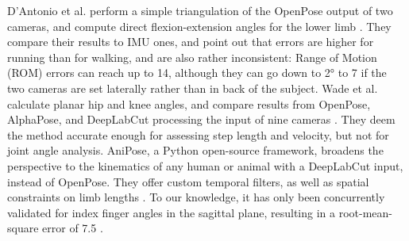D’Antonio et al. perform a simple triangulation of the OpenPose output of two cameras, and compute direct flexion-extension angles for the lower limb \cite{D'Antonio2021}. They compare their results to IMU ones, and point out that errors are higher for running than for walking, and are also rather inconsistent: Range of Motion (ROM) errors can reach up to 14\degree{}, although they can go down to 2° to 7\degree{} if the two cameras are set laterally rather than in back of the subject. Wade et al. calculate planar hip and knee angles, and compare results from OpenPose, AlphaPose, and DeepLabCut processing the input of nine cameras \cite{Wade2021}. They deem the method accurate enough for assessing step length and velocity, but not for joint angle analysis. AniPose, a Python open-source framework, broadens the perspective to the kinematics of any human or animal with a DeepLabCut input, instead of OpenPose. They offer custom temporal filters, as well as spatial constraints on limb lengths \cite{Karashchuk2021}. To our knowledge, it has only been concurrently validated for index finger angles in the sagittal plane, resulting in a root-mean-square error of 7.5\degree{} \cite{Geelen2021}.

